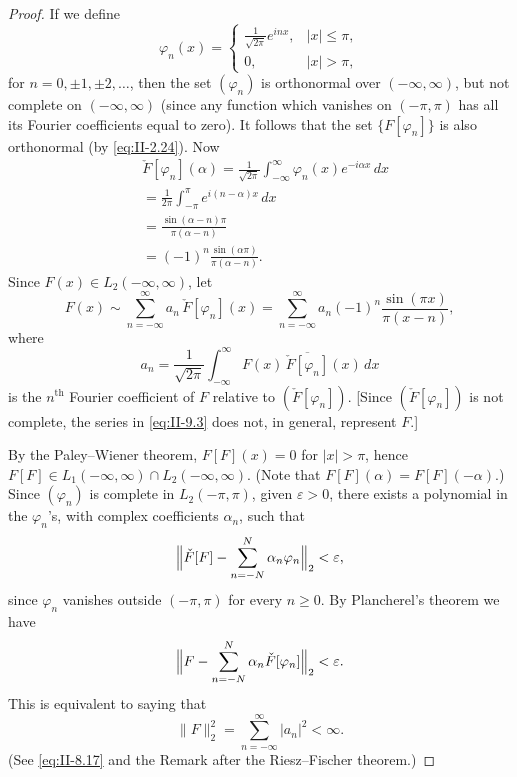 \begin{proof}
If we define
\[
\varphi_{n}(x)=
\begin{cases}
\frac{1}{\sqrt{2\pi}}e^{inx}, & |x|\le\pi,\\
0, & |x|>\pi,
\end{cases}
\]
for $n=0,\pm1,\pm2,\dots$, then the set $(\varphi_{n})$ is orthonormal over $(-\infty,\infty)$, but not complete on $(-\infty,\infty)$ (since any function which vanishes on $(-\pi,\pi)$ has all its Fourier coefficients equal to zero). It follows that the set $\{F[\varphi_{n}]\}$ is also orthonormal (by \eqref{eq:II-2.24}). Now
\[
\begin{aligned}
&\check F[\varphi_{n}](\alpha) = \frac{1}{\sqrt{2\pi}}\int_{-\infty}^{\infty}\varphi_{n}(x)e^{-i\alpha x}\,dx\\
&= \frac{1}{2\pi}\int_{-\pi}^{\pi}e^{i(n-\alpha)x}\,dx\\
&= \frac{\sin(\alpha-n)\pi}{\pi(\alpha-n)}\\
&= (-1)^{n}\frac{\sin(\alpha\pi)}{\pi(\alpha-n)}.
\end{aligned}
\]
Since $F(x)\in L_{2}(-\infty,\infty)$, let
\begin{equation}\tag{9.3}\label{eq:II-9.3}
F(x)\sim\sum_{n=-\infty}^{\infty}a_{n}\,\check F[\varphi_{n}](x)
=\sum_{n=-\infty}^{\infty}a_{n}(-1)^{n}\frac{\sin(\pi x)}{\pi(x-n)},
\end{equation}
where
\[
a_{n}=\frac{1}{\sqrt{2\pi}}\int_{-\infty}^{\infty}F(x)\,\overline{\check F[\varphi_{n}]}(x)\,dx
\]
is the $n^{\text{th}}$ Fourier coefficient of $F$ relative to $(\check F[\varphi_{n}])$. [Since $(\check F[\varphi_{n}])$ is not complete, the series in \eqref{eq:II-9.3} does not, in general, represent $F$.]

By the Paley--Wiener theorem, $F[F](x)=0$ for $|x|>\pi$, hence $F[F]\in L_{1}(-\infty,\infty)\cap L_{2}(-\infty,\infty)$. (Note that $F[F](\alpha)=F[F](-\alpha)$.) Since $(\varphi_{n})$ is complete in $L_{2}(-\pi,\pi)$, given $\varepsilon>0$, there exists a polynomial in the $\varphi_{n}$'s, with complex coefficients $\alpha_{n}$, such that
\[
\Bigl\|\check F[F]-\sum_{n=-N}^{N}\alpha_{n}\varphi_{n}\Bigr\|_{2}<\varepsilon,
\]
since $\varphi_{n}$ vanishes outside $(-\pi,\pi)$ for every $n\ge 0$. By Plancherel's theorem we have
\[
\Bigl\|F-\sum_{n=-N}^{N}\alpha_{n}\check F[\varphi_{n}]\Bigr\|_{2}<\varepsilon.
\]
This is equivalent to saying that
\begin{equation}\tag{9.4}\label{eq:II-9.4}
\|F\|_{2}^{2}=\sum_{n=-\infty}^{\infty}|a_{n}|^{2}<\infty.
\end{equation}
(See \eqref{eq:II-8.17} and the Remark after the Riesz--Fischer theorem.)


\end{proof}
